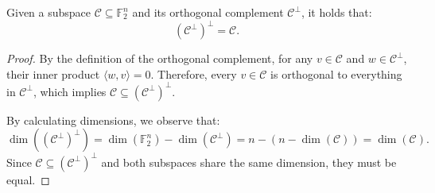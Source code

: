 \begin{lemma}\label{lemma:complement_of_orthogonal_complement}
Given a subspace $\mathcal{C} \subseteq \mathbb{F}^n_2$ and its orthogonal complement $\mathcal{C}^\perp$, it holds that:
\begin{equation}
(\mathcal{C}^\perp)^\perp = \mathcal{C}
.\end{equation}
\begin{proof}
By the definition of the orthogonal complement, for any $v \in \mathcal{C}$ and $w \in \mathcal{C}^\perp$, their inner product $\langle w, v \rangle = 0$. Therefore, every $v \in \mathcal{C}$ is orthogonal to everything in $\mathcal{C}^\perp$, which implies $\mathcal{C} \subseteq (\mathcal{C}^\perp)^\perp$. 

By calculating dimensions, we observe that:
\begin{equation}
\dim((\mathcal{C}^\perp)^\perp) = \dim(\mathbb{F}^n_2) - \dim(\mathcal{C}^\perp) = n - (n - \dim(\mathcal{C})) = \dim(\mathcal{C})
.\end{equation}
Since $\mathcal{C} \subseteq (\mathcal{C}^\perp)^\perp$ and both subspaces share the same dimension, they must be equal.
\end{proof}
\end{lemma}


